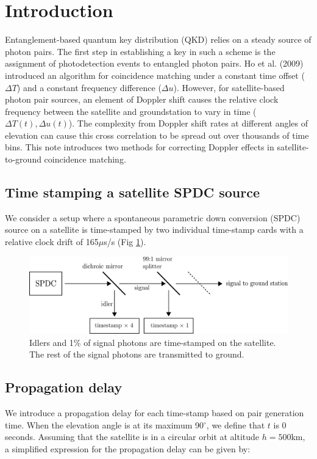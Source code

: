 \section{Introduction}
Entanglement-based quantum key distribution (QKD) relies on a steady source of photon pairs. The first step in establishing a key in such a scheme is the assignment of photodetection events to entangled photon pairs. Ho et al. (2009) \cite{ho2009clock} introduced an algorithm for coincidence matching under a constant time offset ($\Delta T$) and a constant frequency difference ($\Delta u$). However, for satellite-based photon pair sources, an element of Doppler shift causes the relative clock frequency between the satellite and groundstation to vary in time ($\Delta T(t),\Delta u(t)$). The complexity from Doppler shift rates at different angles of elevation can cause this cross correlation to be spread out over thousands of time bins. This note introduces two methods for correcting Doppler effects in satellite-to-ground coincidence matching. 

\subsection{Time stamping a satellite SPDC source}

We consider a setup where a spontaneous parametric down conversion (SPDC) source on a satellite is time-stamped by two individual time-stamp cards with a relative clock drift of 165$\mu$s/s (Fig \ref{fig:spdc_source}).

\begin{figure}[ht!]
	\includegraphics[width=\linewidth]{assets/spdc_source}
	\caption{Idlers and 1\% of signal photons are time-stamped on the satellite. The rest of the signal photons are transmitted to ground.}
	\label{fig:spdc_source}
\end{figure}

\newpage

\subsection{Propagation delay}
We introduce a propagation delay for each time-stamp based on pair generation time. When the elevation angle is at its maximum 90$^\circ$, we define that $t$ is 0 seconds. Assuming that the satellite is in a circular orbit at altitude $h = 500$km, a simplified expression for the propagation delay can be given by:

